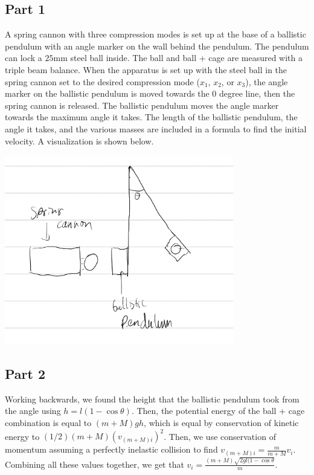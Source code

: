 \documentclass[8pt]{extarticle}
\begin{document}
{\subsection*{Part 1}
A spring cannon with three compression modes is set up at the base of a ballistic pendulum with an angle marker on the wall behind the pendulum. The pendulum can lock a $25$mm steel ball inside. The ball and ball + cage are measured with a triple beam balance. When the apparatus is set up with the steel ball in the spring cannon set to the desired compression mode ($x_1$, $x_2$, or $x_3$), the angle marker on the ballistic pendulum is moved towards the $0$ degree line, then the spring cannon is released. The ballistic pendulum moves the angle marker towards the maximum angle it takes. The length of the ballistic pendulum, the angle it takes, and the various masses are included in a formula to find the initial velocity. A visualization is shown below.
\begin{center}
	\includegraphics[width=10cm]{Lab7Image1}
\end{center}
\subsection*{Part 2}
Working backwards, we found the height that the ballistic pendulum took from the angle using $h = l(1-\cos\theta)$. Then, the potential energy of the ball + cage combination is equal to $(m+M)gh$, which is equal by conservation of kinetic energy to $(1/2)(m+M)(v_{(m+M)i})^2$. Then, we use conservation of momentum assuming a perfectly inelastic collision to find $v_{(m+M)i} = \frac{m}{m+M}v_{i}$. Combining all these values together, we get that $v_i = \frac{(m+M)\sqrt{2gl(1-\cos\theta}}{m}$.
}
\end{document}
